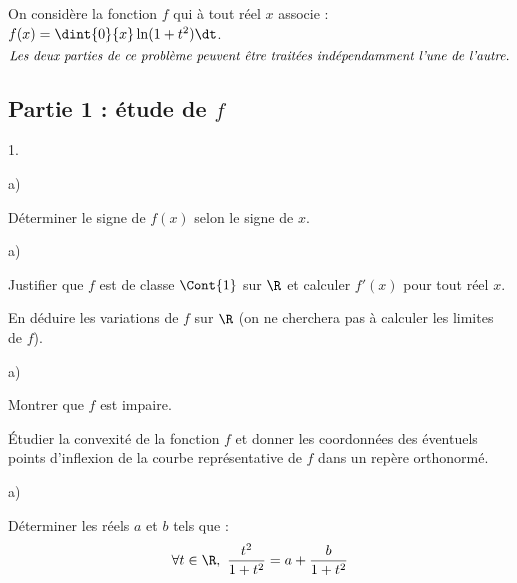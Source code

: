 \documentclass[11pt]{article}%
\begin{document}
\noindent
On considère la fonction $f$ qui à tout réel $x$ associe : $f(x) =
\dint{0}{x} \ln(1+ t^2) \dt$.
\[
\mbox{\it Les deux parties de ce problème peuvent être traitées
  indépendamment l'une de l'autre.}
\]

\subsection*{Partie 1 : étude de $f$}

\begin{noliste}{1.}
  \setlength{\itemsep}{4mm}
\item
  \begin{noliste}{a)}
    \setlength{\itemsep}{2mm}
  \item Déterminer le signe de $f(x)$ selon le signe de $x$.
  \end{noliste}
    
  



  
  \begin{noliste}{a)}
    \setlength{\itemsep}{2mm} %
    \setcounter{enumii}{1}
  \item Justifier que $f$ est de classe $\Cont{1}$ sur $\R$ et
    calculer $f'(x)$ pour tout réel $x$.
    
    
    
  \item En déduire les variations de $f$ sur $\R$ (on ne cherchera pas
    à calculer les limites de $f$).

    
  \end{noliste}




\item 
  \begin{noliste}{a)}
    \setlength{\itemsep}{2mm}
  \item Montrer que $f$ est impaire.

    
    
  \item Étudier la convexité de la fonction $f$ et donner les
    coordonnées des éventuels points d'inflexion de la courbe
    représentative de $f$ dans un repère orthonormé.

    
  \end{noliste}




\item 
  \begin{noliste}{a)}
    \setlength{\itemsep}{2mm}
  \item Déterminer les réels $a$ et $b$ tels que :
    \[
    \forall t \in \R, \ \dfrac{t^2}{1 + t^2} = a + \dfrac{b}{1 + t^2}
    \]


\end{noliste}
\end{noliste}
\end{document}
